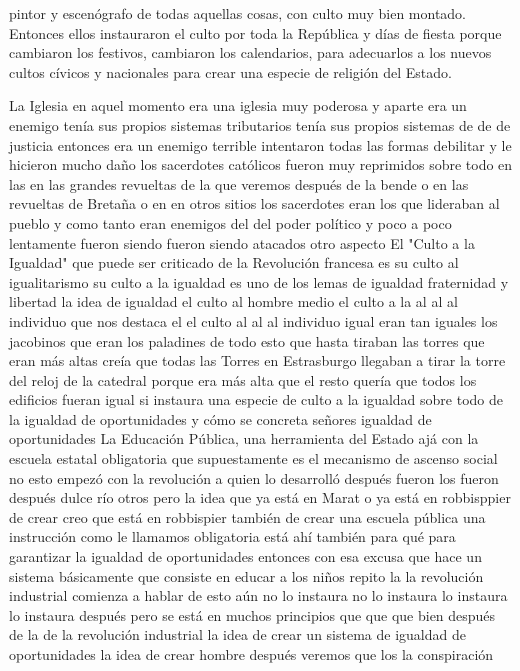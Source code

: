 pintor y escenógrafo de todas aquellas cosas, con culto muy bien montado. Entonces ellos instauraron el culto por toda la República y días de fiesta porque cambiaron los festivos, cambiaron los calendarios, para adecuarlos a los nuevos cultos cívicos y nacionales para crear una especie de religión del Estado.

La Iglesia en aquel momento era una iglesia muy poderosa y aparte era un enemigo tenía sus propios sistemas tributarios
tenía sus propios sistemas de de de justicia entonces era un enemigo terrible intentaron
todas las formas debilitar y le hicieron mucho daño los sacerdotes católicos fueron muy reprimidos
sobre todo en las en las grandes revueltas de la que veremos después de la bende o en las revueltas de Bretaña o en en otros sitios
los sacerdotes eran los que lideraban al pueblo y como tanto eran enemigos del del poder político y poco a poco
lentamente fueron siendo fueron siendo atacados otro aspecto
El "Culto a la Igualdad"
que puede ser criticado de la Revolución francesa es su
culto al igualitarismo su culto a la igualdad es uno de los lemas de igualdad fraternidad y libertad
la idea de igualdad el culto al hombre medio el culto a la al al al individuo que nos destaca
el el culto al al al individuo igual eran tan iguales los jacobinos que eran los paladines de todo esto
que hasta tiraban las torres que eran más altas creía que todas las Torres en Estrasburgo llegaban a tirar la torre del reloj de la catedral
porque era más alta que el resto quería que todos los edificios fueran igual si instaura una especie de culto a la igualdad
sobre todo de la igualdad de oportunidades y cómo se concreta señores igualdad de oportunidades
La Educación Pública, una herramienta del Estado
ajá con la escuela estatal obligatoria que supuestamente es el mecanismo de ascenso social no
esto empezó con la revolución a quien lo desarrolló después fueron los fueron después dulce río otros
pero la idea que ya está en Marat o ya está en robbisppier de crear creo que está en robbispier también de crear una escuela pública
una instrucción como le llamamos obligatoria está ahí también para qué para garantizar la igualdad
de oportunidades entonces con esa excusa que hace un sistema básicamente que consiste en educar a los niños
repito la la revolución industrial comienza a hablar de esto aún no lo instaura no lo instaura lo instaura lo instaura después
pero se está en muchos principios que que que bien después de la de la revolución industrial la idea de crear un sistema de igualdad
de oportunidades la idea de crear hombre después veremos que los la conspiración
